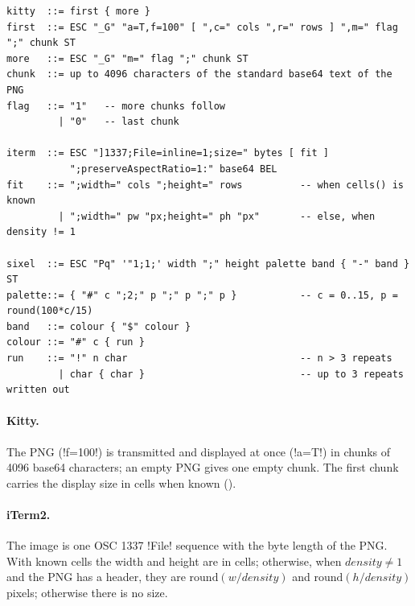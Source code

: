 {\begin{lstlisting}[style=grammar,caption={Inline-image escape sequences. ESC is byte 0x1B, BEL is 0x07, and ST is the two bytes ESC backslash.}]
kitty  ::= first { more }
first  ::= ESC "_G" "a=T,f=100" [ ",c=" cols ",r=" rows ] ",m=" flag ";" chunk ST
more   ::= ESC "_G" "m=" flag ";" chunk ST
chunk  ::= up to 4096 characters of the standard base64 text of the PNG
flag   ::= "1"   -- more chunks follow
         | "0"   -- last chunk

iterm  ::= ESC "]1337;File=inline=1;size=" bytes [ fit ]
           ";preserveAspectRatio=1:" base64 BEL
fit    ::= ";width=" cols ";height=" rows          -- when cells() is known
         | ";width=" pw "px;height=" ph "px"       -- else, when density != 1

sixel  ::= ESC "Pq" '"1;1;' width ";" height palette band { "-" band } ST
palette::= { "#" c ";2;" p ";" p ";" p }           -- c = 0..15, p = round(100*c/15)
band   ::= colour { "$" colour }
colour ::= "#" c { run }
run    ::= "!" n char                              -- n > 3 repeats
         | char { char }                           -- up to 3 repeats written out
\end{lstlisting}

\paragraph{Kitty.} The PNG (\code!f=100!) is transmitted and displayed at once (\code!a=T!) in
chunks of 4096 base64 characters; an empty PNG gives one empty chunk. The first chunk carries
the display size in cells when known
().

\paragraph{iTerm2.} The image is one OSC 1337 \code!File! sequence with the byte length of the
PNG. With known cells the width and height are in cells; otherwise, when $\mathit{density}\neq1$
and the PNG has a header, they are $\mathrm{round}(w/\mathit{density})$ and
$\mathrm{round}(h/\mathit{density})$ pixels; otherwise there is no size.

}
